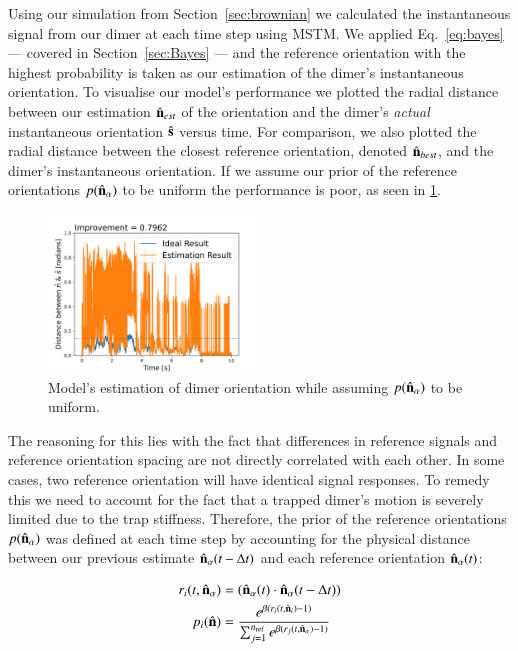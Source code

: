 \documentclass[final, 3p]{elsarticle}
\begin{document}
Using our simulation from Section~\ref{sec:brownian} we calculated the instantaneous signal from our dimer at each time step using MSTM.  We applied Eq.~\eqref{eq:bayes} --- covered in Section~\ref{sec:Bayes} --- and the reference orientation with the highest probability is taken as our estimation of the dimer's instantaneous orientation. To visualise our model's performance  we plotted the radial distance between our estimation $\hat{\bf n}_{est}$ of the orientation and the dimer's \emph{actual} instantaneous orientation $\hat{\bf s}$ versus time. For comparison, we also plotted the radial distance between the closest reference orientation, denoted $\hat{\bf n}_{best}$, and the dimer's instantaneous orientation. If we assume our prior of the reference orientations $p(\hat{\bf n}_\alpha)$ to be uniform the performance is poor, as seen in \ref{fig:uniform}.

\begin{figure}[h]
	\centering
	\includegraphics[width=0.5\textwidth]{./Images/uniform_pn.png}
	\caption{Model's estimation of dimer orientation while assuming $p(\hat{\bf n}_\alpha)$ to be uniform.}
	\label{fig:uniform}
\end{figure} 

The reasoning for this lies with the fact that differences in reference signals and reference orientation spacing are not directly correlated with each other. In some cases, two reference orientation will have identical signal responses. To remedy this we need to account for the fact that a trapped dimer's motion is severely limited due to the trap stiffness. Therefore, the prior of the reference orientations $p(\hat{\bf n}_\alpha)$ was defined at each time step by accounting for the physical distance between our previous estimate $\hat{\bf n}_{\alpha}(t - \Delta t)$ and each reference orientation $\hat{\bf n}_\alpha(t)$:

\begin{align}
  r_i(t, \hat{\bf n}_\alpha)
  &= (\hat{\bf n}_{\alpha}(t) \cdot \hat{\bf n}_\alpha(t-\Delta t))
  \\
  p_i(\hat{\bf n})
  &= \frac{e^{\beta (r_i(t,\hat{\bf n}_i)-1)}}
{\sum_{j=1}^{n_{\rm ref}}e^{\beta(r_j(t, \hat{\bf n}_\alpha)-1)}}
\end{align}
\end{document}
